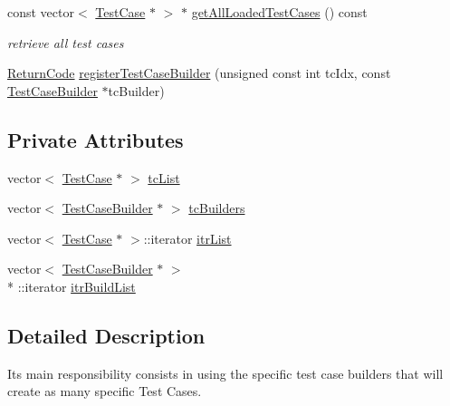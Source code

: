 \begin{DoxyCompactItemize}
const vector$<$ \hyperlink{classit_1_1testbench_1_1data_1_1TestCase}{Test\-Case} $\ast$ $>$ $\ast$ \hyperlink{classit_1_1testbench_1_1data_1_1TestCaseLoader_a01d66e9610f946699823178de96090e3}{get\-All\-Loaded\-Test\-Cases} () const 
\begin{DoxyCompactList}\small\item\em retrieve all test cases \end{DoxyCompactList}\item 
\hyperlink{structit_1_1testbench_1_1data_1_1ReturnCode}{Return\-Code} \hyperlink{classit_1_1testbench_1_1data_1_1TestCaseLoader_ae7f1a9986e60a80b54e0c079404e596b}{register\-Test\-Case\-Builder} (unsigned const int tc\-Idx, const \hyperlink{classit_1_1testbench_1_1data_1_1TestCaseBuilder}{Test\-Case\-Builder} $\ast$tc\-Builder)
\end{DoxyCompactItemize}
\subsection*{Private Attributes}
\begin{DoxyCompactItemize}
\item 
vector$<$ \hyperlink{classit_1_1testbench_1_1data_1_1TestCase}{Test\-Case} $\ast$ $>$ \hyperlink{classit_1_1testbench_1_1data_1_1TestCaseLoader_a69e04f628e711e7a06592664f510b061}{tc\-List}
\item 
vector$<$ \hyperlink{classit_1_1testbench_1_1data_1_1TestCaseBuilder}{Test\-Case\-Builder} $\ast$ $>$ \hyperlink{classit_1_1testbench_1_1data_1_1TestCaseLoader_a43d17d71e6a0b38d053fb48f3cd4219e}{tc\-Builders}
\item 
vector$<$ \hyperlink{classit_1_1testbench_1_1data_1_1TestCase}{Test\-Case} $\ast$ $>$\-::iterator \hyperlink{classit_1_1testbench_1_1data_1_1TestCaseLoader_afcf0ab648278bdb692a1dbc603d630a0}{itr\-List}
\item 
vector$<$ \hyperlink{classit_1_1testbench_1_1data_1_1TestCaseBuilder}{Test\-Case\-Builder} $\ast$ $>$\\*
\-::iterator \hyperlink{classit_1_1testbench_1_1data_1_1TestCaseLoader_a8cb21b96baa5bc91fd0c9a8051aacddf}{itr\-Build\-List}
\end{DoxyCompactItemize}


\subsection{Detailed Description}
Its main responsibility consists in using the specific test case builders that will create as many specific Test Cases.

